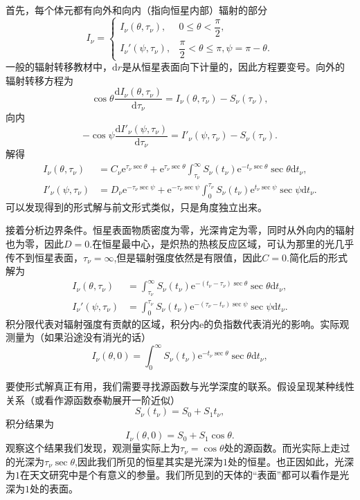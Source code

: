 \documentclass[../天体物理基础.tex]{subfiles}
\begin{document}
首先，每个体元都有向外和向内（指向恒星内部）辐射的部分
\begin{equation}
I_\nu=\begin{cases}
I_\nu(\theta,\tau_\nu), & 0\le\theta<\dfrac{\pi}{2},\\
I_\nu'(\psi,\tau_\nu), & \dfrac{\pi}{2}<\theta\le\pi,\psi=\pi-\theta.
\end{cases}
\end{equation}
一般的辐射转移教材中，$\mathrm{d}r$是从恒星表面向下计量的，因此方程要变号。向外的辐射转移方程为
\begin{equation}
\cos\theta\frac{\mathrm{d}I_\nu(\theta,\tau_\nu)}{\mathrm{d}\tau_\nu}=I_\nu(\theta,\tau_\nu)-S_\nu(\tau_\nu),
\end{equation}
向内
\begin{equation}
-\cos\psi\frac{\mathrm{d}I'_\nu(\psi,\tau_\nu)}{\mathrm{d}\tau_\nu}=I'_\nu(\psi,\tau_\nu)-S_\nu(\tau_\nu).
\end{equation}
解得
\begin{align}
I_\nu(\theta,\tau_\nu)&=C_\nu\mathrm{e}^{\tau_\nu\sec\theta}+\mathrm{e}^{\tau_\nu\sec\theta}\int_{\tau_\nu}^\infty S_\nu(t_\nu)\mathrm{e}^{-t_\nu\sec\theta}\sec\theta\mathrm{d}t_\nu,\\
I'_\nu(\psi,\tau_\nu)&=D_\nu\mathrm{e}^{-\tau_\nu\sec\psi}+\mathrm{e}^{-\tau_\nu\sec\psi}\int_{0}^{\tau_\nu} S_\nu(t_\nu)\mathrm{e}^{t_\nu\sec\psi}\sec\psi\mathrm{d}t_\nu.
\end{align}
可以发现得到的形式解与前文形式类似，只是角度独立出来。

接着分析边界条件。恒星表面物质密度为零，光深肯定为零，同时从外向内的辐射也为零，因此$D=0$.在恒星最中心，是炽热的热核反应区域，可认为那里的光几乎传不到恒星表面，$\tau_{\nu}=\infty$,但是辐射强度依然是有限值，因此$C=0$.简化后的形式解为
\begin{align}
I_\nu(\theta,\tau_\nu)&=\int_{\tau_\nu}^{\infty}S_\nu(t_\nu)\mathrm{e}^{-(t_\nu-\tau_\nu) \sec\theta}\sec\theta\mathrm{d}t_\nu,\\
I_\nu'(\psi,\tau_\nu)&=\int_0^{\tau_\nu}S_\nu(t_\nu)\mathrm{e}^{-(\tau_\nu-t_\nu)\sec\psi}\sec\psi\mathrm{d}t_\nu.
\end{align}
积分限代表对辐射强度有贡献的区域，积分内$\mathrm{e}$​的负指数代表消光的影响。实际观测量为（如果沿途没有消光的话）
\begin{equation}
I_\nu(\theta,0)=\int_{0}^{\infty}S_\nu(t_\nu)\mathrm{e}^{-t_\nu\sec\theta}\sec\theta\mathrm{d}t_\nu,
\end{equation}

要使形式解真正有用，我们需要寻找源函数与光学深度的联系。假设呈现某种线性关系（或看作源函数泰勒展开一阶近似）
\begin{equation}
S_{\nu}\left(t_{\nu}\right)=S_{0}+S_{1}t_{\nu},
\end{equation}
积分结果为
\begin{equation}
I_\nu(\theta,0)=S_{0}+S_{1}\cos\theta.
\end{equation}
观察这个结果我们发现，观测量实际上为$\tau_{\nu}=\cos\theta$处的源函数。而光实际上走过的光深为$\tau_{\nu}\sec\theta$,因此我们所见的恒星其实是光深为$1$处的恒星。也正因如此，光深为$1$在天文研究中是个有意义的参量。我们所见到的天体的“表面”都可以看作是光深为$1$处的表面。
\end{document}
